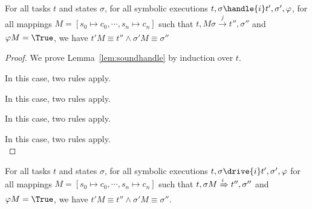 \begin{lemma}
  \label{lem:soundhandle}

  For all tasks $t$ and states $\sigma$,
  for all symbolic executions $t,\sigma\handle{i} t',\sigma',\phi$,
  for all mappings $M = [s_0\mapsto c_0,\cdots,s_n\mapsto c_n]$
  such that $t,M \sigma \xrightarrow[]{j} t'',\sigma''$ and $\phi M = \True$,
  we have $t'M \equiv t'' \wedge \sigma' M \equiv \sigma''$
\end{lemma}

\begin{proof}
  We prove Lemma~\ref{lem:soundhandle} by induction over $t$.\\

    {

    }

  {

  }

  {

  }

  {In this case, two rules apply.\\
  }

  {

  }

  {
  In this case, two rules apply.\\
  }

  {
  In this case, two rules apply.\\
  }

  {
  In this case, two rules apply.\\
  }
\end{proof}

\begin{lemma}
  \label{lem:sounddrive}

  For all tasks $t$ and states $\sigma$,
  for all symbolic executions $t,\sigma\drive{i} t',\sigma',\phi$
  for all mappings $M=[s_0\mapsto c_0,\cdots,s_n\mapsto c_n]$
  such that $t,\sigma M \xRightarrow[]{i} t'',\sigma''$ and $\phi M = \True$,
  we have $t'M \equiv t'' \wedge \sigma' M \equiv \sigma''$.
\end{lemma}


